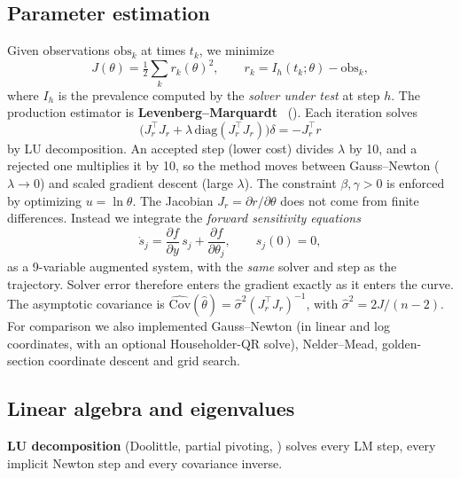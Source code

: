 \documentclass[sigconf]{acmart}
\begin{document}
\subsection{Parameter estimation}
\label{sec:est}
Given observations $\mathrm{obs}_k$ at times $t_k$, we minimize
\begin{equation}
  J(\theta)=\tfrac12\sum_k r_k(\theta)^2,\qquad
  r_k=I_h(t_k;\theta)-\mathrm{obs}_k,
  \label{eq:cost}
\end{equation}
where $I_h$ is the prevalence computed by the \emph{solver under test}
at step $h$. The production estimator is
\textbf{Levenberg--Marquardt}~\cite{levenberg1944,marquardt1963}
(). Each iteration solves
\begin{equation}
  \big(J_r^\top J_r+\lambda\,\mathrm{diag}(J_r^\top J_r)\big)\delta
  =-J_r^\top r
  \label{eq:lm}
\end{equation}
by LU decomposition. An accepted step (lower cost) divides $\lambda$ by
10, and a rejected one multiplies it by 10, so the method moves between
Gauss--Newton ($\lambda\to0$) and scaled gradient descent (large
$\lambda$). The constraint $\beta,\gamma>0$ is enforced by optimizing
$u=\ln\theta$. The Jacobian $J_r=\partial r/\partial\theta$ does not
come from finite differences. Instead we integrate the \emph{forward
sensitivity equations}
\begin{equation}
  \dot s_j = \frac{\partial f}{\partial y}\,s_j+\frac{\partial
  f}{\partial\theta_j},\qquad s_j(0)=0,
  \label{eq:sens}
\end{equation}
as a 9-variable augmented system, with the \emph{same} solver and step
as the trajectory. Solver error therefore enters the gradient exactly as
it enters the curve. The asymptotic covariance is
$\widehat{\mathrm{Cov}}(\hat\theta)=\hat\sigma^2(J_r^\top J_r)^{-1}$,
with $\hat\sigma^2=2J/(n-2)$. For comparison we also implemented
Gauss--Newton (in linear and log coordinates, with an optional
Householder-QR solve), Nelder--Mead, golden-section coordinate descent
and grid search.

\subsection{Linear algebra and eigenvalues}
\label{sec:linalg}
\textbf{LU decomposition} (Doolittle, partial pivoting,
) solves every LM step, every implicit Newton step
and every covariance inverse.
\end{document}
